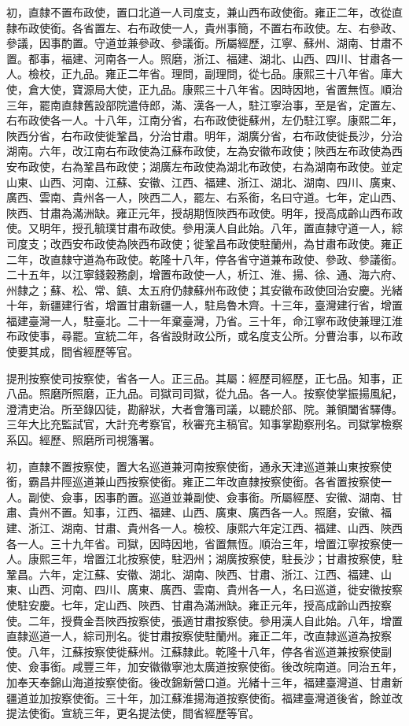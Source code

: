 \begin{pinyinscope}
初，直隸不置布政使，置口北道一人司度支，兼山西布政使銜。雍正二年，改從直隸布政使銜。各省置左、右布政使一人，貴州事簡，不置右布政使。左、右參政、參議，因事酌置。守道並兼參政、參議銜。所屬經歷，江寧、蘇州、湖南、甘肅不置。都事，福建、河南各一人。照磨，浙江、福建、湖北、山西、四川、甘肅各一人。檢校，正九品。雍正二年省。理問，副理問，從七品。康熙三十八年省。庫大使，倉大使，寶源局大使，正九品。康熙三十八年省。因時因地，省置無恆。順治三年，罷南直隸舊設部院遣侍郎，滿、漢各一人，駐江寧治事，至是省，定置左、右布政使各一人。十八年，江南分省，右布政使徙蘇州，左仍駐江寧。康熙二年，陜西分省，右布政使徙鞏昌，分治甘肅。明年，湖廣分省，右布政使徙長沙，分治湖南。六年，改江南右布政使為江蘇布政使，左為安徽布政使；陜西左布政使為西安布政使，右為鞏昌布政使；湖廣左布政使為湖北布政使，右為湖南布政使。並定山東、山西、河南、江蘇、安徽、江西、福建、浙江、湖北、湖南、四川、廣東、廣西、雲南、貴州各一人，陜西二人，罷左、右系銜，名曰守道。七年，定山西、陜西、甘肅為滿洲缺。雍正元年，授胡期恆陜西布政使。明年，授高成齡山西布政使。又明年，授孔毓璞甘肅布政使。參用漢人自此始。八年，置直隸守道一人，綜司度支；改西安布政使為陜西布政使；徙鞏昌布政使駐蘭州，為甘肅布政使。雍正二年，改直隸守道為布政使。乾隆十八年，停各省守道兼布政使、參政、參議銜。二十五年，以江寧錢穀務劇，增置布政使一人，析江、淮、揚、徐、通、海六府、州隸之；蘇、松、常、鎮、太五府仍隸蘇州布政使；其安徽布政使回治安慶。光緒十年，新疆建行省，增置甘肅新疆一人，駐烏魯木齊。十三年，臺灣建行省，增置福建臺灣一人，駐臺北。二十一年棄臺灣，乃省。三十年，命江寧布政使兼理江淮布政使事，尋罷。宣統二年，各省設財政公所，或名度支公所。分曹治事，以布政使要其成，間省經歷等官。

提刑按察使司按察使，省各一人。正三品。其屬：經歷司經歷，正七品。知事，正八品。照磨所照磨，正九品。司獄司司獄，從九品。各一人。按察使掌振揚風紀，澄清吏治。所至錄囚徒，勘辭狀，大者會籓司議，以聽於部、院。兼領闔省驛傳。三年大比充監試官，大計充考察官，秋審充主稿官。知事掌勘察刑名。司獄掌檢察系囚。經歷、照磨所司視籓署。

初，直隸不置按察使，置大名巡道兼河南按察使銜，通永天津巡道兼山東按察使銜，霸昌井陘巡道兼山西按察使銜。雍正二年改直隸按察使銜。各省置按察使一人。副使、僉事，因事酌置。巡道並兼副使、僉事銜。所屬經歷、安徽、湖南、甘肅、貴州不置。知事，江西、福建、山西、廣東、廣西各一人。照磨，安徽、福建、浙江、湖南、甘肅、貴州各一人。檢校、康熙六年定江西、福建、山西、陜西各一人。三十九年省。司獄，因時因地，省置無恆。順治三年，增置江寧按察使一人。康熙三年，增置江北按察使，駐泗州；湖廣按察使，駐長沙；甘肅按察使，駐鞏昌。六年，定江蘇、安徽、湖北、湖南、陜西、甘肅、浙江、江西、福建、山東、山西、河南、四川、廣東、廣西、雲南、貴州各一人，名曰巡道，徙安徽按察使駐安慶。七年，定山西、陜西、甘肅為滿洲缺。雍正元年，授高成齡山西按察使。二年，授費金吾陜西按察使，張適甘肅按察使。參用漢人自此始。八年，增置直隸巡道一人，綜司刑名。徙甘肅按察使駐蘭州。雍正二年，改直隸巡道為按察使。八年，江蘇按察使徙蘇州。江蘇隸此。乾隆十八年，停各省巡道兼按察使副使、僉事銜。咸豐三年，加安徽徽寧池太廣道按察使銜。後改皖南道。同治五年，加奉天奉錦山海道按察使銜。後改錦新營口道。光緒十三年，福建臺灣道、甘肅新疆道並加按察使銜。三十年，加江蘇淮揚海道按察使銜。福建臺灣道後省，餘並改提法使銜。宣統三年，更名提法使，間省經歷等官。


\end{pinyinscope}
